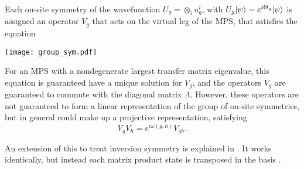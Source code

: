 Each on-site symmetry of the wavefunction $U_g = \otimes_i u^i_g$, with $U_g
\vert \psi \rangle = e^{i \Theta_g} \vert \psi \rangle$ is assigned an operator $V_g$ that
acts on the virtual leg of the MPS, that satisfies the equation
\begin{center}
\texttt{[image: group\_sym.pdf]}
\end{center}

For an MPS with a nondegenerate largest
transfer matrix eigenvalue, this equation is guaranteed have a unique solution
for $V_g$, and the operators $V_g$ are guaranteed to commute with the diagonal
matrix $\Lambda$. However, these operators are not guaranteed to form a linear
representation of the group of on-site symmetries, but in general could make
up a projective representation, satisfying
$$V_g V_h = e^{i \omega(g, h)} V_{gh}.$$








An extension of this to treat inversion symmetry is explained in
. It works identically, but instead each matrix
product state is transposed in the basis .




